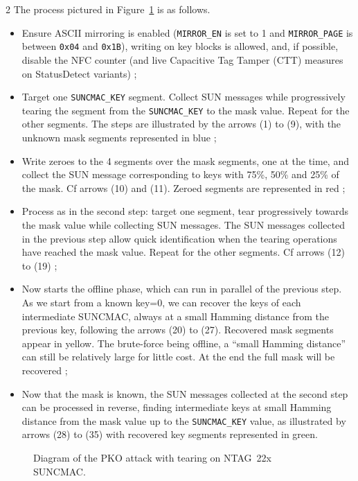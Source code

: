 \documentclass[10pt,letterpaper]{article}
\begin{document}
\begin{multicols}{2}
The process pictured in Figure~\ref{fig:suncmactearpko} is as follows.
\begin{itemize}
    \item Ensure ASCII mirroring is enabled (\texttt{MIRROR\_EN} is set to 1 and \texttt{MIRROR\_PAGE} is between \texttt{0x04} and \texttt{0x1B}), writing on key blocks is allowed, and, if possible, disable the NFC counter (and live Capacitive Tag Tamper (CTT) measures on StatusDetect variants) ;
    \item Target one \texttt{SUNCMAC\_KEY} segment. Collect SUN messages while progressively tearing the segment from the \texttt{SUNCMAC\_KEY} to the mask value. Repeat for the other segments. The steps are illustrated by the arrows (1) to (9), with the unknown mask segments represented in blue ;
    \item Write zeroes to the 4 segments over the mask segments, one at the time, and collect the SUN message corresponding to keys with 75\%, 50\% and 25\% of the mask. Cf arrows (10) and (11). Zeroed segments are represented in red ;
    \item Process as in the second step: target one segment, tear progressively towards the mask value while collecting SUN messages. The SUN messages collected in the previous step allow quick identification when the tearing operations have reached the mask value. Repeat for the other segments. Cf arrows (12) to (19) ;
    \item Now starts the offline phase, which can run in parallel of the previous step. As we start from a known key=0, we can recover the keys of each intermediate SUNCMAC, always at a small Hamming distance from the previous key, following the arrows (20) to (27). Recovered mask segments appear in yellow. The brute-force being offline, a ``small Hamming distance'' can still be relatively large for little cost. At the end the full mask will be recovered ;
    \item Now that the mask is known, the SUN messages collected at the second step can be processed in reverse, finding intermediate keys at small Hamming distance from the mask value up to the \texttt{SUNCMAC\_KEY} value, as illustrated by arrows (28) to (35) with recovered key segments represented in green.
\end{itemize}

\begin{figure}[!htb]
  \centering
  
  \caption{Diagram of the PKO attack with tearing on NTAG~22x SUNCMAC.}
  \label{fig:suncmactearpko}
\end{figure}


\end{multicols}
\end{document}
